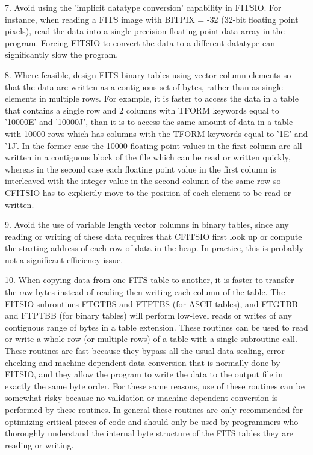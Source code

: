 \documentclass[11pt]{book}
\begin{document}
7. Avoid using the 'implicit datatype conversion' capability in
FITSIO.  For instance, when reading a FITS image with BITPIX = -32
(32-bit floating point pixels), read the data into a single precision
floating point data array in the program.  Forcing FITSIO to convert
the data to a different datatype can significantly slow the program.

8. Where feasible, design FITS binary tables using vector column
elements so that the data are written as a contiguous set of bytes,
rather than as single elements in multiple rows.  For example, it is
faster to access the data in a table that contains a single row
and 2 columns with TFORM keywords equal to  '10000E' and '10000J', than
it is to access the same amount of data in a table with 10000 rows
which has columns with the TFORM keywords equal to '1E' and '1J'.  In
the former case the 10000 floating point values in the first column are
all written in a contiguous block of the file which can be read or
written quickly, whereas in the second case each floating point value
in the first column is interleaved with the integer value in the second
column of the same row so CFITSIO has to explicitly move to the
position of each element to be read or written.

9. Avoid the use of variable length vector columns in binary tables,
since any reading or writing of these data requires that CFITSIO first
look up or compute the starting address of each row of data in the
heap.  In practice, this is probably not a significant efficiency issue.

10. When copying data from one FITS table to another, it is faster to
transfer the raw bytes instead of reading then writing each column of
the table.  The FITSIO subroutines FTGTBS and FTPTBS (for ASCII
tables), and  FTGTBB and FTPTBB (for binary tables) will perform
low-level reads or writes of any contiguous range of bytes in a table
extension.  These routines can be used to read or write a whole row (or
multiple rows) of a table with a single subroutine call.   These
routines are fast because they bypass all the usual data scaling, error
checking and machine dependent data conversion that is normally done by
FITSIO, and they allow the program to write the data to the output file
in exactly the same byte order.  For these same reasons, use of these
routines can be somewhat risky because no validation or machine
dependent conversion is performed by these routines.  In general these
routines are only recommended for optimizing critical pieces of code
and should only be used by programmers who thoroughly understand the
internal byte structure of the FITS tables they are reading or
writing.
\end{document}
